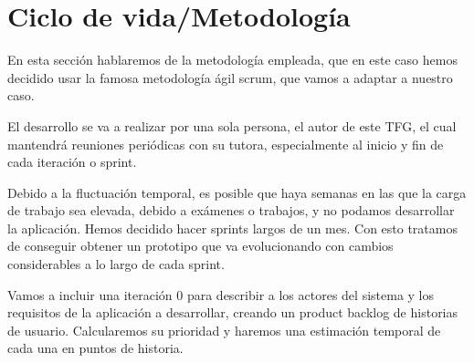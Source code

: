 \section{Ciclo de vida/Metodología}
En esta sección hablaremos de la metodología empleada, que en este caso hemos decidido usar la famosa metodología ágil scrum, que vamos a adaptar a nuestro caso.

El desarrollo se va a realizar por una sola persona, el autor de este TFG, el cual mantendrá reuniones periódicas con su tutora, especialmente al inicio y fin de cada iteración o sprint.

Debido a la fluctuación temporal, es posible que haya semanas en las que la carga de trabajo sea elevada, debido a exámenes o trabajos, y no podamos desarrollar la aplicación. Hemos decidido hacer sprints largos de un mes. Con esto tratamos de conseguir obtener un prototipo que va evolucionando con cambios considerables a lo largo de cada sprint.

Vamos a incluir una iteración 0 para describir a los actores del sistema y los requisitos de la aplicación a desarrollar, creando un product backlog de historias de usuario. Calcularemos  su prioridad y haremos una estimación temporal de cada una en puntos de historia.  


